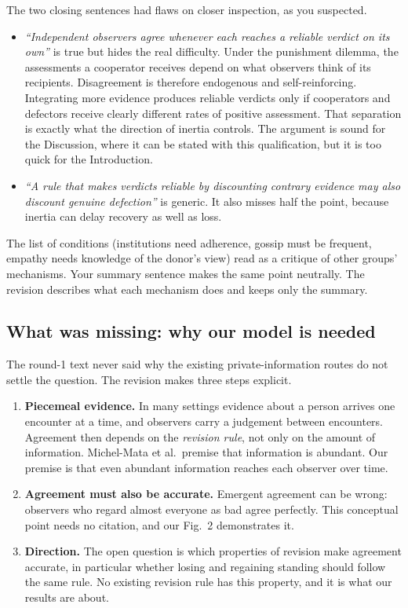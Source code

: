 \documentclass[11pt]{article}
\newcommand{\old}[1]{\textit{``#1''}}
\begin{document}
The two closing sentences had flaws on closer inspection, as you suspected.
\begin{itemize}[leftmargin=1.2em]
\item \old{Independent observers agree whenever each reaches a reliable verdict on its own} is true but hides the real difficulty. Under the punishment dilemma, the assessments a cooperator receives depend on what observers think of its recipients. Disagreement is therefore endogenous and self-reinforcing. Integrating more evidence produces reliable verdicts only if cooperators and defectors receive clearly different rates of positive assessment. That separation is exactly what the direction of inertia controls. The argument is sound for the Discussion, where it can be stated with this qualification, but it is too quick for the Introduction.
\item \old{A rule that makes verdicts reliable by discounting contrary evidence may also discount genuine defection} is generic. It also misses half the point, because inertia can delay recovery as well as loss.
\end{itemize}

The list of conditions (institutions need adherence, gossip must be frequent, empathy needs knowledge of the donor's view) read as a critique of other groups' mechanisms. Your summary sentence makes the same point neutrally. The revision describes what each mechanism does and keeps only the summary.

\subsection*{What was missing: why our model is needed}
The round-1 text never said why the existing private-information routes do not settle the question. The revision makes three steps explicit.
\begin{enumerate}[leftmargin=1.5em]
\item \textbf{Piecemeal evidence.} In many settings evidence about a person arrives one encounter at a time, and observers carry a judgement between encounters. Agreement then depends on the \emph{revision rule}, not only on the amount of information. Michel-Mata et al.\ premise that information is abundant. Our premise is that even abundant information reaches each observer over time.
\item \textbf{Agreement must also be accurate.} Emergent agreement can be wrong: observers who regard almost everyone as bad agree perfectly. This conceptual point needs no citation, and our Fig.~2 demonstrates it.
\item \textbf{Direction.} The open question is which properties of revision make agreement accurate, in particular whether losing and regaining standing should follow the same rule. No existing revision rule has this property, and it is what our results are about.
\end{enumerate}
\end{document}
